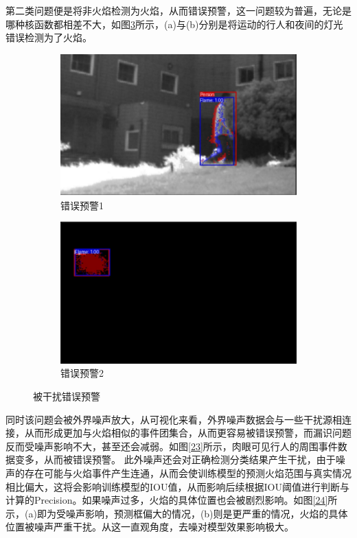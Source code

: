 第二类问题便是将非火焰检测为火焰，从而错误预警，这一问题较为普遍，无论是哪种核函数都相差不大，如图\ref{22}所示，(a)与(b)分别是将运动的行人和夜间的灯光错误检测为了火焰。
\begin{figure}[ht]
    \centering
    \begin{subfigure}{0.49\textwidth}
        \centering
        \includegraphics[width=\textwidth]{figures/jiance4.png}
        \caption{错误预警1}
        \label{22.a}
    \end{subfigure}
    \hfill
    \begin{subfigure}{0.49\textwidth}
        \centering
        \includegraphics[width=\textwidth]{figures/jiance5.png}
        \caption{错误预警2}
        \label{22.b}
    \end{subfigure}
    \caption{被干扰错误预警}
    \label{22}
\end{figure}

同时该问题会被外界噪声放大，从可视化来看，外界噪声数据会与一些干扰源相连接，从而形成更加与火焰相似的事件团集合，从而更容易被错误预警，而漏识问题反而受噪声影响不大，甚至还会减弱。如图\ref{23}所示，肉眼可见行人的周围事件数据变多，从而被错误预警。
此外噪声还会对正确检测分类结果产生干扰，由于噪声的存在可能与火焰事件产生连通，从而会使训练模型的预测火焰范围与真实情况相比偏大，这将会影响训练模型的IOU值，从而影响后续根据IOU阈值进行判断与计算的Precision。如果噪声过多，火焰的具体位置也会被剧烈影响。如图\ref{24}所示，(a)即为受噪声影响，预测框偏大的情况，(b)则是更严重的情况，火焰的具体位置被噪声严重干扰。从这一直观角度，去噪对模型效果影响极大。


